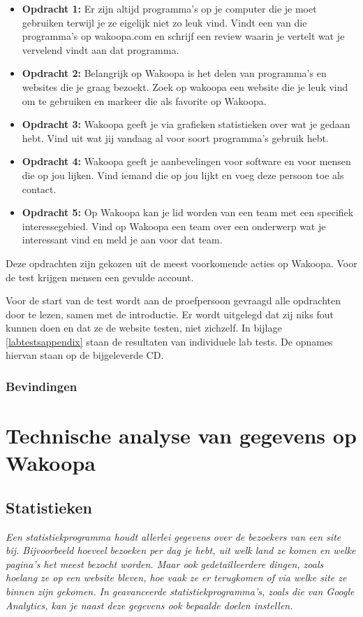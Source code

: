 \documentclass[a4paper, 10pt, pdftex]{report}
\begin{document}
    \begin{itemize}
      \item \textbf{Opdracht 1:}
      Er zijn altijd programma's op je computer die je moet gebruiken terwijl je ze eigelijk niet zo leuk vind. Vindt een van die programma's op wakoopa.com en schrijf een review waarin je vertelt wat je vervelend vindt aan dat programma.

      \item \textbf{Opdracht 2:}
      Belangrijk op Wakoopa is het delen van programma's en websites die je graag bezoekt. Zoek op wakoopa een website die je leuk vind om te gebruiken en markeer die als favorite op Wakoopa.

      \item \textbf{Opdracht 3:}
      Wakoopa geeft je via grafieken statistieken over wat je gedaan hebt. Vind uit wat jij vandaag al voor soort programma's gebruik hebt.

      \item \textbf{Opdracht 4:}
      Wakoopa geeft je aanbevelingen voor software en voor mensen die op jou lijken. Vind iemand die op jou lijkt en voeg deze persoon toe als contact.

      \item \textbf{Opdracht 5:}
      Op Wakoopa kan je lid worden van een team met een specifiek interessegebied. Vind op Wakoopa een team over een onderwerp wat je interessant vind en meld je aan voor dat team.
    \end{itemize}
    Deze opdrachten zijn gekozen uit de meest voorkomende acties op Wakoopa. Voor de test krijgen mensen een gevulde account.

    Voor de start van de test wordt aan de proefpersoon gevraagd alle opdrachten door te lezen, samen met de introductie. Er wordt uitgelegd dat zij niks fout kunnen doen en dat ze de website testen, niet zichzelf. In bijlage \ref{labtestsappendix} staan de resultaten van individuele lab tests. De opnames hiervan staan op de bijgeleverde CD.

    \subsection{Bevindingen}


  \newpage
  \chapter{Technische analyse van gegevens op Wakoopa}
    \label{datachapter}
    \newpage
    \section{Statistieken}
    \textit{Een statistiekprogramma houdt allerlei gegevens over de bezoekers van een site bij. Bijvoorbeeld hoeveel bezoeken per dag je hebt, uit welk land ze komen en welke pagina's het meest bezocht worden. Maar ook gedetailleerdere dingen, zoals hoelang ze op een website bleven, hoe vaak ze er terugkomen of via welke site ze binnen zijn gekomen. In geavanceerde statistiekprogramma's, zoals die van Google Analytics, kan je naast deze gegevens ook bepaalde doelen instellen.}
\end{document}
